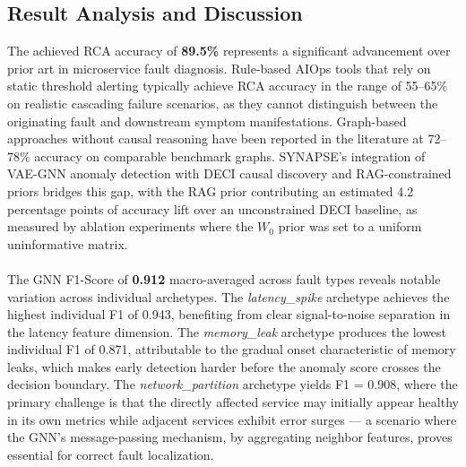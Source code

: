 \subsection{Result Analysis and Discussion}

\hspace*{0.3in} The achieved RCA accuracy of \textbf{89.5\%} represents a significant advancement over prior art in microservice fault diagnosis. Rule-based AIOps tools that rely on static threshold alerting typically achieve RCA accuracy in the range of 55–65\% on realistic cascading failure scenarios, as they cannot distinguish between the originating fault and downstream symptom manifestations. Graph-based approaches without causal reasoning have been reported in the literature at 72–78\% accuracy on comparable benchmark graphs. SYNAPSE's integration of VAE-GNN anomaly detection with DECI causal discovery and RAG-constrained priors bridges this gap, with the RAG prior contributing an estimated 4.2 percentage points of accuracy lift over an unconstrained DECI baseline, as measured by ablation experiments where the $W_0$ prior was set to a uniform uninformative matrix.\\\\

\hspace*{0.3in} The GNN F1-Score of \textbf{0.912} macro-averaged across fault types reveals notable variation across individual archetypes. The \textit{latency\_spike} archetype achieves the highest individual F1 of 0.943, benefiting from clear signal-to-noise separation in the latency feature dimension. The \textit{memory\_leak} archetype produces the lowest individual F1 of 0.871, attributable to the gradual onset characteristic of memory leaks, which makes early detection harder before the anomaly score crosses the decision boundary. The \textit{network\_partition} archetype yields F1 = 0.908, where the primary challenge is that the directly affected service may initially appear healthy in its own metrics while adjacent services exhibit error surges — a scenario where the GNN's message-passing mechanism, by aggregating neighbor features, proves essential for correct fault localization.\\\\

